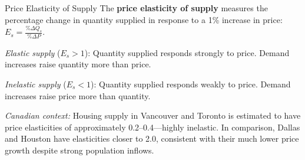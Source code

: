 \begin{defbox}{Price Elasticity of Supply}
The \textbf{price elasticity of supply} measures the percentage change in quantity supplied in response to a 1\% increase in price: $E_s = \frac{\% \Delta Q_s}{\% \Delta P}$.

\textit{Elastic supply} ($E_s > 1$): Quantity supplied responds strongly to price. Demand increases raise quantity more than price.

\textit{Inelastic supply} ($E_s < 1$): Quantity supplied responds weakly to price. Demand increases raise price more than quantity.

\textit{Canadian context:} Housing supply in Vancouver and Toronto is estimated to have price elasticities of approximately 0.2--0.4---highly inelastic. In comparison, Dallas and Houston have elasticities closer to 2.0, consistent with their much lower price growth despite strong population inflows.
\end{defbox}

